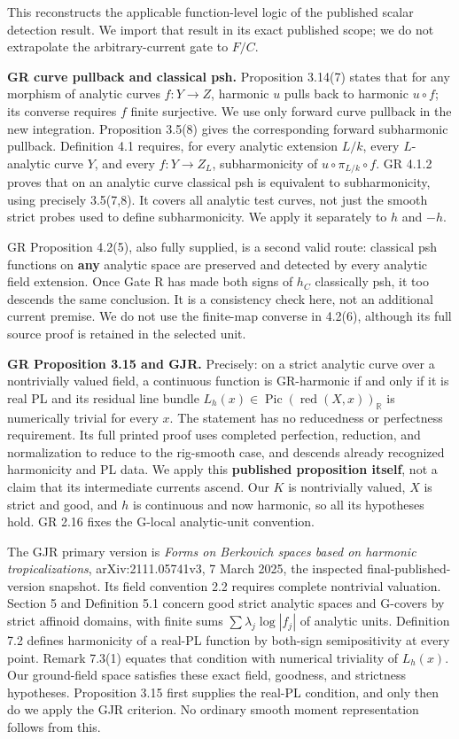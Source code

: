 \documentclass[
  11pt,
]{article}
\begin{document}
This reconstructs the applicable function-level logic of the published
scalar detection result. We import that result in its exact published
scope; we do not extrapolate the arbitrary-current gate to \(F/C\).

\textbf{GR curve pullback and classical psh.} Proposition 3.14(7) states
that for any morphism of analytic curves \(f:Y\to Z\), harmonic \(u\)
pulls back to harmonic \(u\circ f\); its converse requires \(f\) finite
surjective. We use only forward curve pullback in the new integration.
Proposition 3.5(8) gives the corresponding forward subharmonic pullback.
Definition 4.1 requires, for every analytic extension \(L/k\), every
\(L\)-analytic curve \(Y\), and every \(f:Y\to Z_L\), subharmonicity of
\(u\circ\pi_{L/k}\circ f\). GR 4.1.2 proves that on an analytic curve
classical psh is equivalent to subharmonicity, using precisely 3.5(7,8).
It covers all analytic test curves, not just the smooth strict probes
used to define subharmonicity. We apply it separately to \(h\) and
\(-h\).

GR Proposition 4.2(5), also fully supplied, is a second valid route:
classical psh functions on \textbf{any} analytic space are preserved and
detected by every analytic field extension. Once Gate R has made both
signs of \(h_C\) classically psh, it too descends the same conclusion.
It is a consistency check here, not an additional current premise. We do
not use the finite-map converse in 4.2(6), although its full source
proof is retained in the selected unit.

\textbf{GR Proposition 3.15 and GJR.} Precisely: on a strict analytic
curve over a nontrivially valued field, a continuous function is
GR-harmonic if and only if it is real PL and its residual line bundle
\(L_h(x)\in\operatorname{Pic}(\operatorname{red}(X,x))_{\mathbb{R}}\) is
numerically trivial for every \(x\). The statement has no reducedness or
perfectness requirement. Its full printed proof uses completed
perfection, reduction, and normalization to reduce to the rig-smooth
case, and descends already recognized harmonicity and PL data. We apply
this \textbf{published proposition itself}, not a claim that its
intermediate currents ascend. Our \(K\) is nontrivially valued, \(X\) is
strict and good, and \(h\) is continuous and now harmonic, so all its
hypotheses hold. GR 2.16 fixes the G-local analytic-unit convention.

The GJR primary version is \emph{Forms on Berkovich spaces based on
harmonic tropicalizations}, arXiv:2111.05741v3, 7 March 2025, the
inspected final-published-version snapshot. Its field convention 2.2
requires complete nontrivial valuation. Section 5 and Definition 5.1
concern good strict analytic spaces and G-covers by strict affinoid
domains, with finite sums \(\sum\lambda_j\log|f_j|\) of analytic units.
Definition 7.2 defines harmonicity of a real-PL function by both-sign
semipositivity at every point. Remark 7.3(1) equates that condition with
numerical triviality of \(L_h(x)\). Our ground-field space satisfies
these exact field, goodness, and strictness hypotheses. Proposition 3.15
first supplies the real-PL condition, and only then do we apply the GJR
criterion. No ordinary smooth moment representation follows from this.
\end{document}
